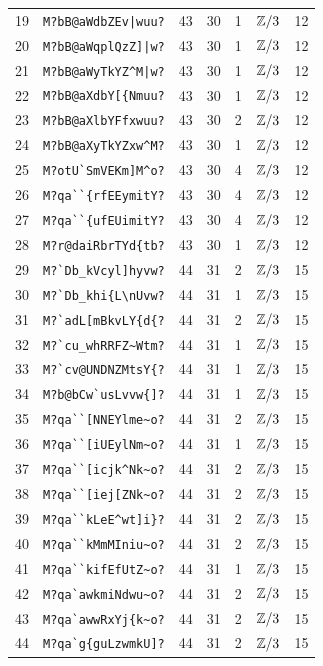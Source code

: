 \begin{longtable}{rlrrrrl}
19 & \verb+M?bB@aWdbZEv|wuu?+ & 43 & 30 & 1 & $\mathbb Z/3$ & 12 \\
20 & \verb+M?bB@aWqplQzZ]|w?+ & 43 & 30 & 1 & $\mathbb Z/3$ & 12 \\
21 & \verb+M?bB@aWyTkYZ^M|w?+ & 43 & 30 & 1 & $\mathbb Z/3$ & 12 \\
22 & \verb+M?bB@aXdbY[{Nmuu?+ & 43 & 30 & 1 & $\mathbb Z/3$ & 12 \\
23 & \verb+M?bB@aXlbYFfxwuu?+ & 43 & 30 & 2 & $\mathbb Z/3$ & 12 \\
24 & \verb+M?bB@aXyTkYZxw^M?+ & 43 & 30 & 1 & $\mathbb Z/3$ & 12 \\
25 & \verb+M?otU`SmVEKm]M^o?+ & 43 & 30 & 4 & $\mathbb Z/3$ & 12 \\
26 & \verb+M?qa``{rfEEymitY?+ & 43 & 30 & 4 & $\mathbb Z/3$ & 12 \\
27 & \verb+M?qa``{ufEUimitY?+ & 43 & 30 & 4 & $\mathbb Z/3$ & 12 \\
28 & \verb+M?r@daiRbrTYd{tb?+ & 43 & 30 & 1 & $\mathbb Z/3$ & 12 \\
29 & \verb+M?`Db_kVcyl]hyvw?+ & 44 & 31 & 2 & $\mathbb Z/3$ & 15 \\
30 & \verb+M?`Db_khi{L\nUvw?+ & 44 & 31 & 1 & $\mathbb Z/3$ & 15 \\
31 & \verb+M?`adL[mBkvLY{d{?+ & 44 & 31 & 2 & $\mathbb Z/3$ & 15 \\
32 & \verb+M?`cu_whRRFZ~Wtm?+ & 44 & 31 & 1 & $\mathbb Z/3$ & 15 \\
33 & \verb+M?`cv@UNDNZMtsY{?+ & 44 & 31 & 1 & $\mathbb Z/3$ & 15 \\
34 & \verb+M?b@bCw`usLvvw{]?+ & 44 & 31 & 1 & $\mathbb Z/3$ & 15 \\
35 & \verb+M?qa``[NNEYlme~o?+ & 44 & 31 & 2 & $\mathbb Z/3$ & 15 \\
36 & \verb+M?qa``[iUEylNm~o?+ & 44 & 31 & 1 & $\mathbb Z/3$ & 15 \\
37 & \verb+M?qa``[icjk^Nk~o?+ & 44 & 31 & 2 & $\mathbb Z/3$ & 15 \\
38 & \verb+M?qa``[iej[ZNk~o?+ & 44 & 31 & 2 & $\mathbb Z/3$ & 15 \\
39 & \verb+M?qa``kLeE^wt]i}?+ & 44 & 31 & 2 & $\mathbb Z/3$ & 15 \\
40 & \verb+M?qa``kMmMIniu~o?+ & 44 & 31 & 2 & $\mathbb Z/3$ & 15 \\
41 & \verb+M?qa``kifEfUtZ~o?+ & 44 & 31 & 1 & $\mathbb Z/3$ & 15 \\
42 & \verb+M?qa`awkmiNdwu~o?+ & 44 & 31 & 2 & $\mathbb Z/3$ & 15 \\
43 & \verb+M?qa`awwRxYj{k~o?+ & 44 & 31 & 2 & $\mathbb Z/3$ & 15 \\
44 & \verb+M?qa`g{guLzwmkU]?+ & 44 & 31 & 2 & $\mathbb Z/3$ & 15 \\

\end{longtable}
